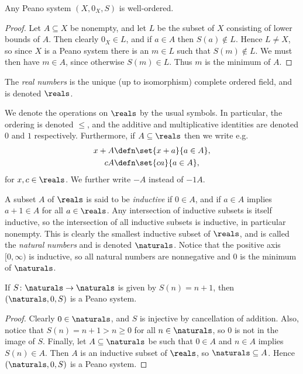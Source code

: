 \documentclass[article, a4paper, 11pt, oneside]{memoir}
\numberwithin{equation}{chapter}
\begin{document}
\begin{corollary}
    Any Peano system $(X,0_X,S)$ is well-ordered.
\end{corollary}

\begin{proof}
    Let $A \subseteq X$ be nonempty, and let $L$ be the subset of $X$ consisting of lower bounds of $A$. Then clearly $0_X \in L$, and if $a \in A$ then $S(a) \not\in L$. Hence $L \neq X$, so since $X$ is a Peano system there is an $m \in L$ such that $S(m) \not\in L$. We must then have $m \in A$, since otherwise $S(m) \in L$. Thus $m$ is the minimum of $A$.
\end{proof}


\begin{definition}
    The \emph{real numbers} is the unique (up to isomorphism) complete ordered field, and is denoted $\reals$.
\end{definition}
%
We denote the operations on $\reals$ by the usual symbols. In particular, the ordering is denoted $\leq$, and the additive and multiplicative identities are denoted $0$ and $1$ respectively. Furthermore, if $A \subseteq \reals$ then we write e.g.
%
\begin{align*}
    x + A
        &\defn \set{x + a}{a \in A}, \\
    cA
        &\defn \set{ca}{a \in A},
\end{align*}
%
for $x,c \in \reals$. We further write $-A$ instead of $-1A$.

A subset $A$ of $\reals$ is said to be \emph{inductive} if $0 \in A$, and if $a \in A$ implies $a + 1 \in A$ for all $a \in \reals$. Any intersection of inductive subsets is itself inductive, so the intersection of all inductive subsets is inductive, in particular nonempty. This is clearly the smallest inductive subset of $\reals$, and is called the \emph{natural numbers} and is denoted $\naturals$. Notice that the positive axis $[0,\infty)$ is inductive, so all natural numbers are nonnegative and $0$ is the minimum of $\naturals$.

\begin{proposition}
    If $S \colon \naturals \to \naturals$ is given by $S(n) = n+1$, then $(\naturals,0,S)$ is a Peano system.
\end{proposition}

\begin{proof}
    Clearly $0 \in \naturals$, and $S$ is injective by cancellation of addition. Also, notice that $S(n) = n+1 > n \geq 0$ for all $n \in \naturals$, so $0$ is not in the image of $S$. Finally, let $A \subseteq \naturals$ be such that $0 \in A$ and $n \in A$ implies $S(n) \in A$. Then $A$ is an inductive subset of $\reals$, so $\naturals \subseteq A$. Hence $(\naturals,0,S)$ is a Peano system.
\end{proof}
\end{document}
